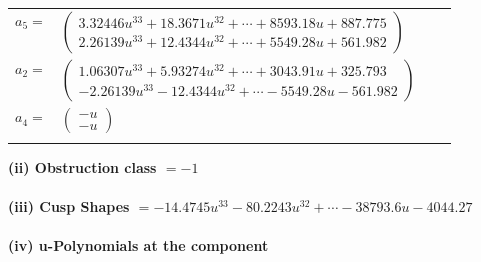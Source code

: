 \documentclass[1p]{elsarticle_modified}
\theoremstyle{definition}
\begin{document}
\begin{tabular}{m{7pt} m{180pt} m{7pt} m{180pt} }
\flushright $a_{5}=$&$\begin{pmatrix}3.32446 u^{33}+18.3671 u^{32}+\cdots+8593.18 u+887.775\\2.26139 u^{33}+12.4344 u^{32}+\cdots+5549.28 u+561.982\end{pmatrix}$ \\
\flushright $a_{2}=$&$\begin{pmatrix}1.06307 u^{33}+5.93274 u^{32}+\cdots+3043.91 u+325.793\\-2.26139 u^{33}-12.4344 u^{32}+\cdots-5549.28 u-561.982\end{pmatrix}$ \\
\flushright $a_{4}=$&$\begin{pmatrix}- u\\- u\end{pmatrix}$\\&\end{tabular}
\flushleft \textbf{(ii) Obstruction class $= -1$}\\~\\
\flushleft \textbf{(iii) Cusp Shapes $= -14.4745 u^{33}-80.2243 u^{32}+\cdots-38793.6 u-4044.27$}\\~\\
\newpage\renewcommand{\arraystretch}{1}
\flushleft \textbf{(iv) u-Polynomials at the component}\newline \\
\end{document}

